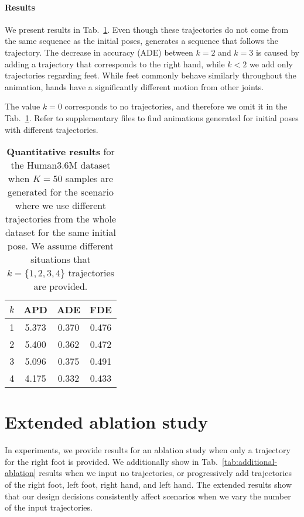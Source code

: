 \documentclass[main.tex]{subfiles}
\begin{document}
\paragraph{Results} We present results in Tab.~\ref{tab:different-scenario}. Even though these trajectories do not come from the same sequence as the initial poses, \trajevae{} generates a sequence that follows the trajectory. The decrease in accuracy (ADE) between $k = 2$ and $k=3$ is caused by adding a trajectory that corresponds to the right hand, while $k < 2$ we add only trajectories regarding feet. While feet commonly behave similarly throughout the animation, hands have a significantly different motion from other joints.

The value $k=0$ corresponds to no trajectories, and therefore we omit it in the Tab.~\ref{tab:different-scenario}. Refer to supplementary files to find animations generated for initial poses with different trajectories.

\begin{table}[!htbp]
    \centering
    \small
    \begin{tabular}{cccc}
    \toprule
         $k$ & APD &    ADE &    FDE \\
        \midrule
         1 &     5.373 &  0.370 &  0.476 \\
         2 &     5.400 &  0.362 &  0.472 \\
         3 &     5.096 &  0.375 &  0.491 \\
         4 &     4.175 &  0.332 &  0.433 \\
    \bottomrule
    \end{tabular}
    \caption{
    \textbf{Quantitative results} for the Human3.6M dataset when $K=50$ samples are generated for the scenario where we use different trajectories from the whole dataset for the same initial pose. We assume different situations that \mbox{$k=\{1, 2, 3, 4\}$} trajectories are provided.}
    \label{tab:different-scenario}
\end{table}

\section{Extended ablation study}
In experiments, we provide results for an ablation study when only a trajectory for the right foot is provided. We additionally show in Tab.~\ref{tab:additional-ablation} results when we input no trajectories, or progressively add trajectories of the right foot, left foot, right hand, and left hand. The extended results show that our design decisions consistently affect scenarios when we vary the number of the input trajectories.
\end{document}
